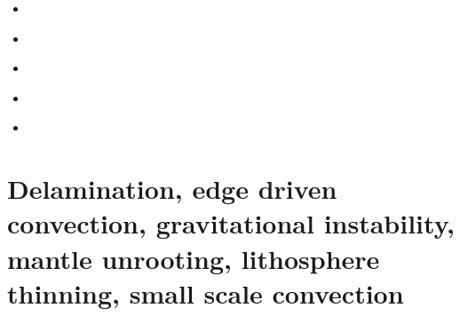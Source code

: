 \begin{scriptsize}
\begin{itemize}
\textcite{wavp15} 
\textcite{thkp15} 
\textcite{mags15} 
\textcite{duys15} 
\textcite{dusp15} 
\item[\twothousandsixteen] 
\textcite{wahz16} 
\textcite{heps16}
\item[\twothousandseventeen] 
\textcite{rugb17} 
\textcite{ozgw17} 
\textcite{vomc17} 
\textcite{taac17} 
\textcite{ithc17} 
\textcite{liwg17} 
\item[\twothousandeighteen]
\textcite{wavp18} 
\textcite{nigw18} 
\textcite{bemc18} 
\textcite{neew18} 
\textcite{stbe18} 
\item[\twothousandnineteen] 
\textcite{koen19} 
\textcite{kipd19} 
\textcite{crcm19} 
\textcite{pedm19} 
\textcite{mazz19} 
\textcite{chch19} 
\textcite{jart19} 
\item[\twothousandtwenty] 
\textcite{yamq20}
\textcite{miko20}
\end{itemize}
\end{scriptsize}


\section{Delamination, edge driven convection, gravitational instability, mantle unrooting, lithosphere thinning, small scale convection} 

